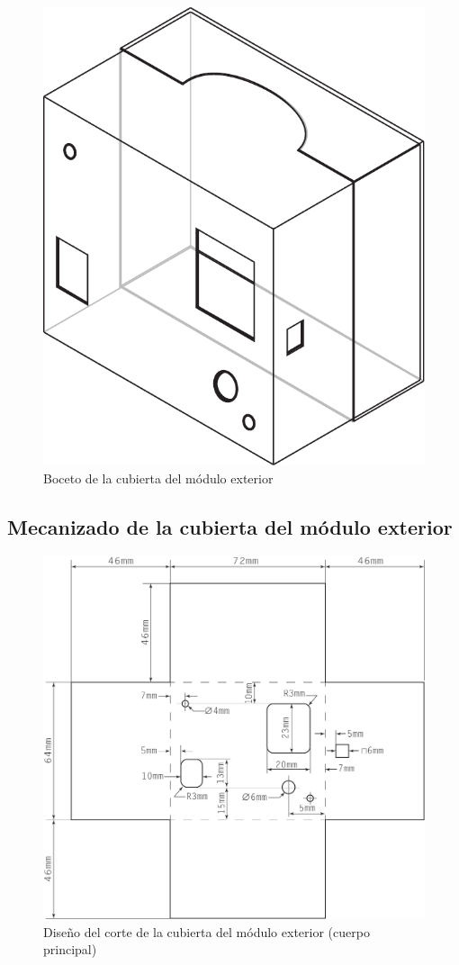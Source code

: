 \vfill

\begin{figure}[H]
  \centering
  \includegraphics[width=0.6\columnwidth]{../design/exterior-body-design}
  \caption{Boceto de la cubierta del módulo exterior}
  \label{fig:exterior-body-design}
\end{figure}

\vfill

\subsection{Mecanizado de la cubierta del módulo exterior}

\vfill

\begin{figure}[H]
  \centering
  \includegraphics[width=1\columnwidth]{../design/exterior-body-blueprint}
  \caption{Diseño del corte de la cubierta del módulo exterior (cuerpo principal)}
  \label{fig:exterior-body-blueprint}
\end{figure}

